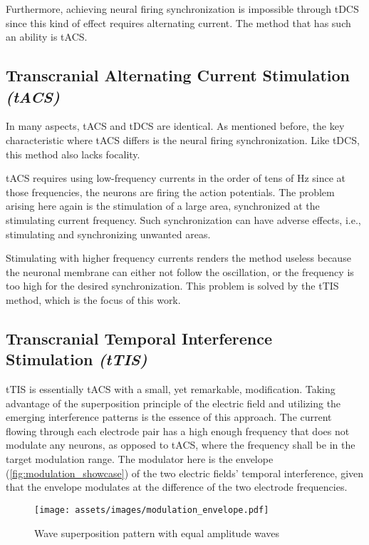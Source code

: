 Furthermore, achieving neural firing synchronization is impossible through \gls{tDCS} since this kind of effect requires alternating current. The method that has such an ability is \gls{tACS}.

\subsection{Transcranial Alternating Current Stimulation \textit{(tACS)}}

In many aspects, \gls{tACS} and \gls{tDCS} are identical. As mentioned before, the key characteristic where \gls{tACS} differs is the neural firing synchronization. Like \gls{tDCS}, this method also lacks focality.

\gls{tACS} requires using low-frequency currents in the order of tens of Hz since at those frequencies, the neurons are firing the action potentials. The problem arising here again is the stimulation of a large area, synchronized at the stimulating current frequency. Such synchronization can have adverse effects, i.e., stimulating and synchronizing unwanted areas.

Stimulating with higher frequency currents renders the method useless because the neuronal membrane can either not follow the oscillation, or the frequency is too high for the desired synchronization. This problem is solved by the \gls{tTIS} method, which is the focus of this work.

\subsection{Transcranial Temporal Interference Stimulation \textit{(tTIS)}}

\gls{tTIS} is essentially \gls{tACS} with a small, yet remarkable, modification. Taking advantage of the superposition principle of the electric field and utilizing the emerging interference patterns is the essence of this approach. The current flowing through each electrode pair has a high enough frequency that does not modulate any neurons, as opposed to \gls{tACS}, where the frequency shall be in the target modulation range. The modulator here is the envelope (\autoref{fig:modulation_showcase}) of the two electric fields' temporal interference, given that the envelope modulates at the difference of the two electrode frequencies.

\begin{figure}[H]
    \centering
    \texttt{[image: assets/images/modulation\_envelope.pdf]}
    \caption{Wave superposition pattern with equal amplitude waves}
    \label{fig:modulation_showcase}
\end{figure}


